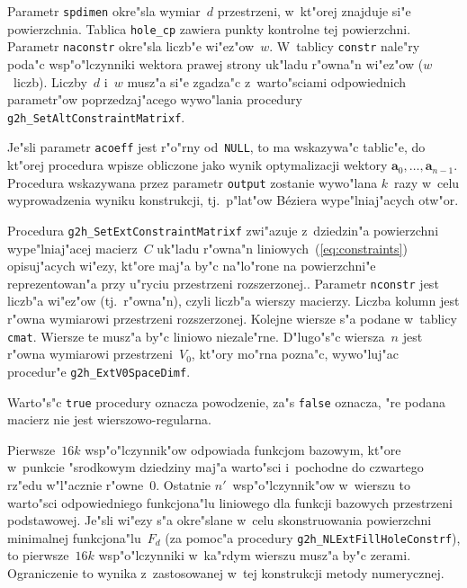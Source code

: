 Parametr \texttt{spdimen} okre"sla wymiar~$d$ przestrzeni, w~kt"orej znajduje
si"e powierzchnia. Tablica \texttt{hole\_cp} zawiera punkty kontrolne tej
powierzchni. Parametr \texttt{naconstr} okre"sla liczb"e wi"ez"ow~$w$.
W~tablicy \texttt{constr} nale"ry poda"c wsp"o"lczynniki wektora prawej
strony uk"ladu r"owna"n wi"ez"ow ($w$~liczb). Liczby~$d$ i~$w$ musz"a si"e
zgadza"c z~warto"sciami odpowiednich parametr"ow poprzedzaj"acego wywo"lania
procedury \texttt{g2h\_SetAltConstraintMatrixf}.

Je"sli parametr \texttt{acoeff} jest r"o"rny od~\texttt{NULL}, to ma wskazywa"c
tablic"e, do kt"orej procedura wpisze obliczone jako wynik optymalizacji
wektory $\bm{a}_0,\ldots,\bm{a}_{n-1}$. Procedura wskazywana przez
parametr \texttt{output} zostanie wywo"lana $k$~razy w~celu wyprowadzenia
wyniku konstrukcji, tj.\ p"lat"ow B\'{e}ziera wype"lniaj"acych otw"or.

\vspace{\bigskipamount}
Procedura \texttt{g2h\_SetExtConstraintMatrixf} zwi"azuje z~dziedzin"a
powierzchni wype"lniaj"acej macierz~$C$ uk"ladu r"owna"n
liniowych~(\ref{eq:constraints}) opisuj"acych wi"ezy, kt"ore maj"a by"c
na"lo"rone na powierzchni"e reprezentowan"a przy u"ryciu przestrzeni rozszerzonej..
Parametr \texttt{nconstr} jest liczb"a wi"ez"ow (tj.\ r"owna"n), czyli liczb"a
wierszy macierzy. Liczba kolumn jest r"owna wymiarowi przestrzeni rozszerzonej.
Kolejne wiersze s"a podane w~tablicy \texttt{cmat}. Wiersze te musz"a by"c
liniowo niezale"rne. D"lugo"s"c wiersza~$n$ jest r"owna wymiarowi przestrzeni~$V_0$,
kt"ory mo"rna pozna"c, wywo"luj"ac procedur"e \texttt{g2h\_ExtV0SpaceDimf}.

Warto"s"c \texttt{true} procedury oznacza powodzenie, za"s \texttt{false}
oznacza, "re podana macierz nie jest wierszowo-regularna.

Pierwsze~$16k$ wsp"o"lczynnik"ow odpowiada funkcjom bazowym, kt"ore w~punkcie
"srodkowym dziedziny maj"a warto"sci i~pochodne do czwartego rz"edu w"l"acznie
r"owne~$0$. Ostatnie $n'$~wsp"o"lczynnik"ow w~wierszu to warto"sci
odpowiedniego funkcjona"lu liniowego dla funkcji bazowych przestrzeni podstawowej.
Je"sli wi"ezy s"a okre"slane w~celu skonstruowania powierzchni minimalnej
funkcjona"lu~$F_d$ (za pomoc"a procedury \texttt{g2h\_NLExtFillHoleConstrf}),
to pierwsze~$16k$ wsp"o"lczynniki w~ka"rdym wierszu musz"a by"c zerami.
Ograniczenie to wynika z~zastosowanej w~tej konstrukcji metody numerycznej.

